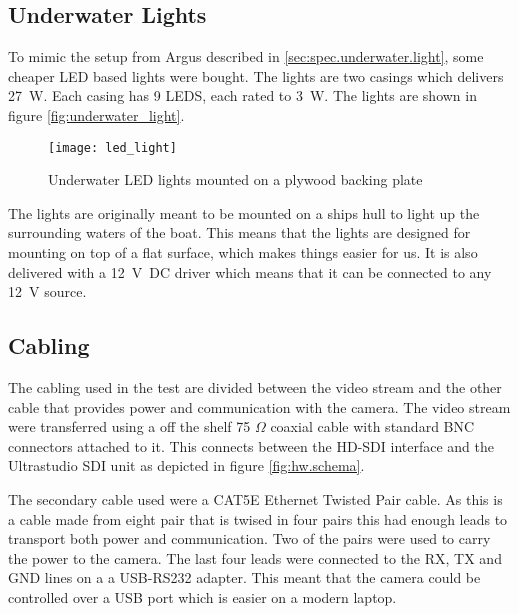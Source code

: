 \subsection{Underwater Lights}
To mimic the setup from Argus described in \vref{sec:spec.underwater.light}, some cheaper LED based lights were bought. The lights are two casings 
which delivers \SI{27}{\watt}. Each casing has 9 LEDS, each rated to \SI{3}{\watt}. The lights are shown in figure \vref{fig:underwater_light}.

\begin{figure}[htbp]
	\centering
	\texttt{[image: led\_light]}
	\caption{Underwater LED lights mounted on a plywood backing plate}
	\label{fig:underwater_light}
\end{figure}

The lights are originally meant to be mounted on a ships hull to light up the surrounding waters of the boat. 
This means that the lights are designed for mounting on top of a flat surface, which makes things easier for us. It 
is also delivered with a \SI{12}{\volt DC} driver which means that it can be connected to any 
\SI{12}{\volt} source.

\subsection{Cabling}
The cabling used in the test are divided between the video stream and the other cable that provides power and communication with the camera.
The video stream were transferred using a off the shelf 75 $\Omega$ coaxial cable with standard BNC connectors attached to it. This 
connects between the HD-SDI interface and the Ultrastudio SDI unit as depicted in figure \vref{fig:hw.schema}.

The secondary cable used were a CAT5E Ethernet Twisted Pair cable. As this is a cable made from eight pair that is twised in four pairs this 
had enough leads to transport both power and communication. Two of the pairs were used to carry the power to the camera. The last four leads 
were connected to the RX, TX and GND lines on a a USB-RS232 adapter. This meant that the camera could be controlled over a USB port which 
is easier on a modern laptop.

